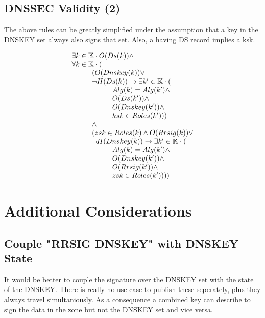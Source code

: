 \documentclass[twoside,english, a4paper]{article}
\begin{document}
\subsection{DNSSEC Validity (2)}

The above rules can be greatly simplified under the assumption that 
a key in the DNSKEY set always also signs that set. Also, a having 
DS record implies a ksk. 

\begin{equation}
\begin{array}{l}
				\exists k \in \mathbb{K} \cdot O(Ds(k))
				\wedge \\
				\forall k \in \mathbb{K} \cdot (\\
\hskip 1cm			(O(Dnskey(k)) \vee \\
\hskip 1cm			\neg H(Ds(k)) \rightarrow \exists k' \in \mathbb{K} \cdot (\\
\hskip 2cm				Alg(k) = Alg(k') \wedge \\
\hskip 2cm				O(Ds(k')) \wedge \\
\hskip 2cm				O(Dnskey(k')) \wedge \\
\hskip 2cm				ksk \in Roles(k'))) \\
\hskip 1cm			\wedge\\
\hskip 1cm			(zsk \in Roles(k) \wedge O(Rrsig(k)) \vee \\
\hskip 1cm			\neg H(Dnskey(k)) \rightarrow \exists k' \in \mathbb{K} \cdot (\\
\hskip 2cm				Alg(k) = Alg(k') \wedge \\
\hskip 2cm				O(Dnskey(k')) \wedge \\
\hskip 2cm				O(Rrsig(k')) \wedge \\
\hskip 2cm				zsk \in Roles(k'))))
\end{array}
\end{equation}

\section{Additional Considerations}

\subsection{Couple "RRSIG DNSKEY" with DNSKEY State}

It would be better to couple the signature over the DNSKEY set with
the state of the DNSKEY. There is really no use case to publish these
seperately, plus they always travel simultaniously. As a consequence
a combined key can describe to sign the data in the zone but not the
DNSKEY set and vice versa.
\end{document}
